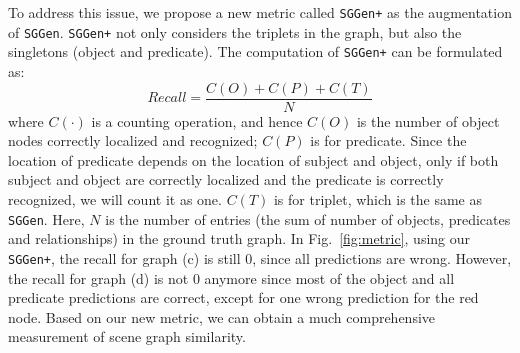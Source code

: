 To address this issue, we propose a new metric called \texttt{SGGen+} as the augmentation of \texttt{SGGen}. \texttt{SGGen+} not only considers the triplets in the graph, but also the singletons (object and predicate). The computation of \texttt{SGGen+} can be formulated as:
\begin{equation}
Recall = \frac{C(O) + C(P) + C(T)}{N}
\end{equation}
where $C(\cdot)$ is a counting operation, and hence $C(O)$ is the number of object nodes correctly localized and recognized; $C(P)$ is for predicate. Since the location of predicate depends on the location of subject and object, only if both subject and object are correctly localized and the predicate is correctly recognized, we will count it as one. $C(T)$ is for triplet, which is the same as \texttt{SGGen}. Here, $N$ is the number of entries (the sum of number of objects, predicates and relationships) in the ground truth graph. In Fig.~\ref{fig:metric}, using our \texttt{SGGen+}, the recall for graph (c) is still 0, since all predictions are wrong. However, the recall for graph (d) is not 0 anymore since most of the object and all predicate predictions are correct, except for one wrong prediction for the red node. Based on our new metric, we can obtain a much comprehensive measurement of scene graph similarity.